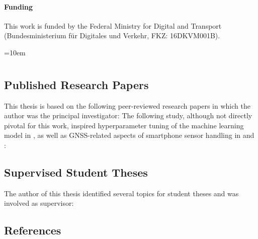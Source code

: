 \documentclass[
  ngerman,english, %
  fontsize=12pt,twoside,BCOR=6mm, %
  numbers=noenddot, %
  cd=fullcolor,
  open=right,
  headings=heavy,
  chapterpage=true,
  cdfont=off, %
  sfdefaults=false,
]{tudscrmanual}
\begin{document}
\subsubsection*{Funding}

This work is funded by the Federal Ministry for Digital and Transport (Bundesministerium für Digitales und Verkehr, FKZ: 16DKVM001B).
\vfill

\newpage

\tableofcontents


\nocite{matthes2022matching}
\nocite{matthes2023geo}
\nocite{matthes2023accurate}
\nocite{matthes2022selecting}

\nocite{lorenz_2022}
\nocite{pickhardt_2022}
\nocite{jeschor_2022}
\nocite{lahr_2023}
\nocite{pickhardt_2023}
\nocite{wieland_2023}
\nocite{pix_2024}








\newpage

\emergencystretch=10em

\chapter*{\bibname}

\section*{Published Research Papers}
This thesis is based on the following peer-reviewed research papers in which the author was the principal investigator:
\printbibliography[heading=none,nottype=student,keyword={ownpaper,related}]
The following study, although not directly pivotal for this work, inspired hyperparameter tuning of the machine learning model in , as well as GNSS-related aspects of smartphone sensor handling in  and :
\printbibliography[heading=none,notkeyword={student},keyword={ownpaper,notrelated}]
\vfill
\pagebreak

\section*{Supervised Student Theses}
The author of this thesis identified several topics for student theses and was involved as supervisor:
\printbibliography[heading=none,keyword={student},notkeyword={ownpaper}]
\vfill
\pagebreak

\section*{References}
\printbibliography[heading=none,notkeyword={student},notkeyword={ownpaper,notrelated},notkeyword={ownpaper,related}]
\vfill
\pagebreak

\newpage
\renewcommand{\glsnamefont}[1]{\color{cidarkblue} \textbf{#1} \dotfill}
\printunsrtglossary[type=abbreviations,title={Abbreviations}]
\end{document}
